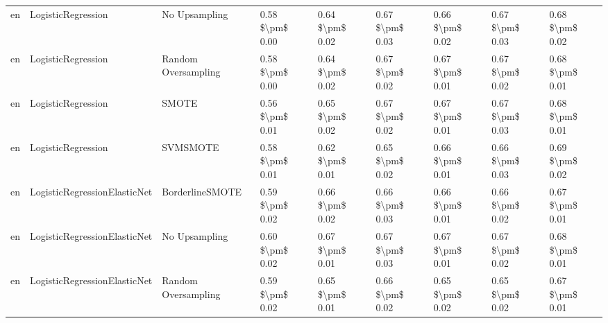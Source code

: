 \begin{tabular}{lllllllll}
      en &              LogisticRegression &                 No Upsampling & 0.58 \$\textbackslash pm\$ 0.00 &           0.64 \$\textbackslash pm\$ 0.02 &       0.67 \$\textbackslash pm\$ 0.03 &        0.66 \$\textbackslash pm\$ 0.02 &                         0.67 \$\textbackslash pm\$ 0.03 &     0.68 \$\textbackslash pm\$ 0.02 \\
      en &              LogisticRegression &           Random Oversampling & 0.58 \$\textbackslash pm\$ 0.00 &           0.64 \$\textbackslash pm\$ 0.02 &       0.67 \$\textbackslash pm\$ 0.02 &        0.67 \$\textbackslash pm\$ 0.01 &                         0.67 \$\textbackslash pm\$ 0.02 &     0.68 \$\textbackslash pm\$ 0.01 \\
      en &              LogisticRegression &                         SMOTE & 0.56 \$\textbackslash pm\$ 0.01 &           0.65 \$\textbackslash pm\$ 0.02 &       0.67 \$\textbackslash pm\$ 0.02 &        0.67 \$\textbackslash pm\$ 0.01 &                         0.67 \$\textbackslash pm\$ 0.03 &     0.68 \$\textbackslash pm\$ 0.01 \\
      en &              LogisticRegression &                      SVMSMOTE & 0.58 \$\textbackslash pm\$ 0.01 &           0.62 \$\textbackslash pm\$ 0.01 &       0.65 \$\textbackslash pm\$ 0.02 &        0.66 \$\textbackslash pm\$ 0.01 &                         0.66 \$\textbackslash pm\$ 0.03 &     0.69 \$\textbackslash pm\$ 0.02 \\
      en &    LogisticRegressionElasticNet &               BorderlineSMOTE & 0.59 \$\textbackslash pm\$ 0.02 &           0.66 \$\textbackslash pm\$ 0.02 &       0.66 \$\textbackslash pm\$ 0.03 &        0.66 \$\textbackslash pm\$ 0.01 &                         0.66 \$\textbackslash pm\$ 0.02 &     0.67 \$\textbackslash pm\$ 0.01 \\
      en &    LogisticRegressionElasticNet &                 No Upsampling & 0.60 \$\textbackslash pm\$ 0.02 &           0.67 \$\textbackslash pm\$ 0.01 &       0.67 \$\textbackslash pm\$ 0.03 &        0.67 \$\textbackslash pm\$ 0.01 &                         0.67 \$\textbackslash pm\$ 0.02 &     0.68 \$\textbackslash pm\$ 0.01 \\
      en &    LogisticRegressionElasticNet &           Random Oversampling & 0.59 \$\textbackslash pm\$ 0.02 &           0.65 \$\textbackslash pm\$ 0.01 &       0.66 \$\textbackslash pm\$ 0.02 &        0.65 \$\textbackslash pm\$ 0.02 &                         0.65 \$\textbackslash pm\$ 0.02 &     0.67 \$\textbackslash pm\$ 0.01 \\

\end{tabular}
